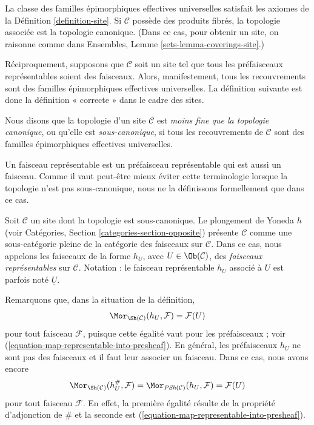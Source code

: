 \noindent
La classe des familles épimorphiques effectives universelles
satisfait les axiomes de la Définition \ref{definition-site}.
Si $\mathcal{C}$ possède des produits fibrés, la topologie associée est
la topologie canonique. (Dans ce cas, pour obtenir un site, on raisonne comme dans Ensembles,
Lemme \ref{sets-lemma-coverings-site}.)

\medskip\noindent
Réciproquement, supposons que $\mathcal{C}$ soit un site tel que
tous les préfaisceaux représentables soient des faisceaux. Alors, manifestement, tous
les recouvrements sont des familles épimorphiques effectives universelles.
La définition suivante est donc la définition « correcte » dans le
cadre des sites.

\begin{definition}
\label{definition-weaker-than-canonical}
Nous disons que la topologie d’un site $\mathcal{C}$ est
{\it moins fine que la topologie canonique}, ou qu’elle est
{\it sous-canonique}, si tous les recouvrements
de $\mathcal{C}$ sont des familles épimorphiques effectives universelles.
\end{definition}

\noindent
Un faisceau représentable est un préfaisceau représentable qui est aussi un
faisceau. Comme il vaut peut-être mieux éviter cette terminologie lorsque la
topologie n’est pas sous-canonique, nous ne la définissons formellement que dans ce cas.

\begin{definition}
\label{definition-representable-sheaf}
Soit $\mathcal{C}$ un site dont la topologie est sous-canonique.
Le plongement de Yoneda $h$ (voir
Catégories, Section \ref{categories-section-opposite})
présente $\mathcal{C}$ comme une sous-catégorie pleine de la
catégorie des faisceaux sur $\mathcal{C}$. Dans ce cas,
nous appelons les faisceaux de la forme $h_U$, avec $U \in \Ob(\mathcal{C})$,
des {\it faisceaux représentables} sur $\mathcal{C}$.
Notation : le faisceau représentable $h_U$ associé à $U$ est parfois
noté {\it $\underline{U}$}.
\end{definition}

\noindent
Remarquons que, dans la situation de la définition,
$$
\Mor_{\Sh(\mathcal{C})}(h_U, \mathcal{F}) = \mathcal{F}(U)
$$
pour tout faisceau $\mathcal{F}$, puisque cette égalité vaut pour les préfaisceaux ; voir
(\ref{equation-map-representable-into-presheaf}). En général, les
préfaisceaux $h_U$ ne sont pas des faisceaux et il faut leur associer un
faisceau. Dans ce cas, nous avons encore
\begin{equation}
\label{equation-map-representable-into-sheaf}
\Mor_{\Sh(\mathcal{C})}(h_U^\#, \mathcal{F}) =
\Mor_{\textit{PSh}(\mathcal{C})}(h_U, \mathcal{F}) =
\mathcal{F}(U)
\end{equation}
pour tout faisceau $\mathcal{F}$. En effet, la première égalité résulte
de la propriété d’adjonction de $\#$ et la seconde est
(\ref{equation-map-representable-into-presheaf}).


